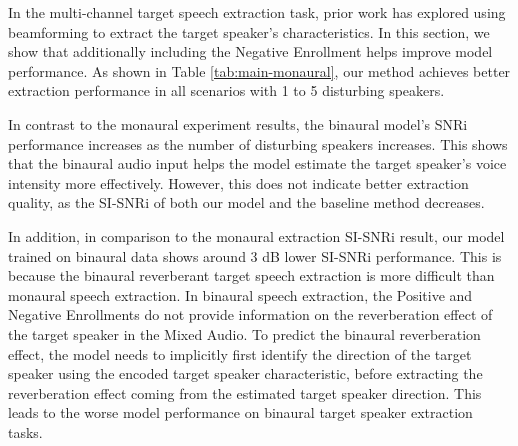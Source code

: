 
In the multi-channel target speech extraction task, prior work \cite{Veluri2024lookonce} has explored using beamforming to extract the target speaker's characteristics. In this section, we show that additionally including the Negative Enrollment helps improve model performance. As shown in Table \ref{tab:main-monaural}, our method achieves better extraction performance in all scenarios with 1 to 5 disturbing speakers. 

In contrast to the monaural experiment results, the binaural model's SNRi performance increases as the number of disturbing speakers increases. This shows that the binaural audio input helps the model estimate the target speaker's voice intensity more effectively. However, this does not indicate better extraction quality, as the SI-SNRi of both our model and the baseline method decreases.

In addition, in comparison to the monaural extraction SI-SNRi result, our model trained on binaural data shows around 3 dB lower SI-SNRi performance. This is because the binaural reverberant target speech extraction is more difficult than monaural speech extraction. In binaural speech extraction, the Positive and Negative Enrollments do not provide information on the reverberation effect of the target speaker in the Mixed Audio. To predict the binaural reverberation effect, the model needs to implicitly first identify the direction of the target speaker using the encoded target speaker characteristic, before extracting the reverberation effect coming from the estimated target speaker direction. This leads to the worse model performance on binaural target speaker extraction tasks. 




